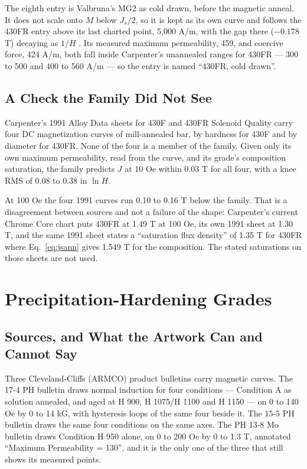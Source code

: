 \documentclass[
  11pt,
]{article}
\begin{document}
The eighth entry is Valbruna's MG2 as cold drawn, before the magnetic anneal. It does not scale onto \(M\) below \(J_s/2\), so it is kept as its own curve and follows the 430FR entry above its last charted point, 5,000 A/m, with the gap there ($-0.178$ T) decaying as \(1/H\) \cite{meeker-iron}. Its measured maximum permeability, 459, and coercive force, 424 A/m, both fall inside Carpenter's unannealed ranges for 430FR --- 300 to 500 and 400 to 560 A/m \cite{carpenter-alloydata} --- so the entry is named ``430FR, cold drawn''.

\subsection{A Check the Family Did Not See}\label{annealed-check}

Carpenter's 1991 Alloy Data sheets for 430F and 430FR Solenoid Quality \cite{carpenter-alloydata} carry four DC magnetization curves of mill-annealed bar, by hardness for 430F and by diameter for 430FR. None of the four is a member of the family. Given only its own maximum permeability, read from the curve, and its grade's composition saturation, the family predicts \(J\) at 10 Oe within 0.03 T for all four, with a knee RMS of 0.08 to 0.38 in \(\ln H\).

At 100 Oe the four 1991 curves run 0.10 to 0.16 T below the family. That is a disagreement between sources and not a failure of the shape: Carpenter's current Chrome Core chart puts 430FR at 1.49 T at 100 Oe, its own 1991 sheet at 1.30 T, and the same 1991 sheet states a ``saturation flux density'' of 1.35 T for 430FR where Eq.~\eqref{eq:jsann} gives 1.549 T for the composition. The stated saturations on those sheets are not used.

\section{Precipitation-Hardening Grades}\label{ph}

\subsection{Sources, and What the Artwork Can and Cannot Say}\label{ph-sources}

Three Cleveland-Cliffs (ARMCO) product bulletins carry magnetic curves. The 17-4 PH bulletin \cite{clf-174} draws normal induction for four conditions --- Condition A as solution annealed, and aged at H 900, H 1075/H 1100 and H 1150 --- on 0 to 140 Oe by 0 to 14 kG, with hysteresis loops of the same four beside it. The 15-5 PH bulletin \cite{clf-155} draws the same four conditions on the same axes. The PH 13-8 Mo bulletin \cite{clf-138} draws Condition H 950 alone, on 0 to 200 Oe by 0 to 1.3 T, annotated ``Maximum Permeability = 130'', and it is the only one of the three that still shows its measured points.
\end{document}
